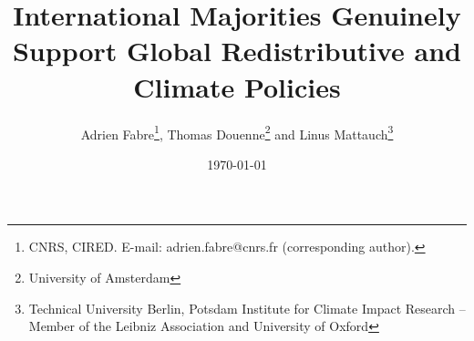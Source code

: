% 


\title{International Majorities Genuinely Support Global Redistributive and Climate Policies
} 

\author{Adrien Fabre\footnote{CNRS, CIRED. E-mail: adrien.fabre@cnrs.fr (corresponding author).}, Thomas Douenne\footnote{University of Amsterdam}\; and Linus Mattauch\footnote{Technical University Berlin, Potsdam Institute for Climate Impact Research -- Member of the Leibniz Association and University of Oxford}
} %

\date{\today} %



\maketitle

\begin{center}
\end{center}


